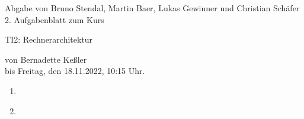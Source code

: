 \documentclass[11pt]{article}
\newcommand{\VORLESUNG}{TI2: Rechnerarchitektur}
\newcommand{\STUDENTS}{Bruno Stendal, Martin Baer, Lukas Gewinner und Christian Schäfer}
\newcommand{\STAFF}{Bernadette Keßler}
\newcommand{\ASSIGNMENT}{2}
\newcommand{\DELIVER}{Freitag, den 18.11.2022, 10:15 Uhr}
\newcommand{\aufgabe}[1]{\item{\bf #1}}
\begin{document}
\ofoot{\pagemark}
\begin{center}
    Abgabe von \STUDENTS{}\\
 \ASSIGNMENT{}. Aufgabenblatt  zum Kurs 
\vspace*{0.2cm}

{\Large \VORLESUNG{}}

{\small von \STAFF{} \\ bis \DELIVER{}.}
\vspace*{0.5cm}\\
\end{center}
\begin{enumerate}
\setcounter{enumi}{0}
\aufgabe{}
\aufgabe{}
\end{enumerate}
\end{document}
